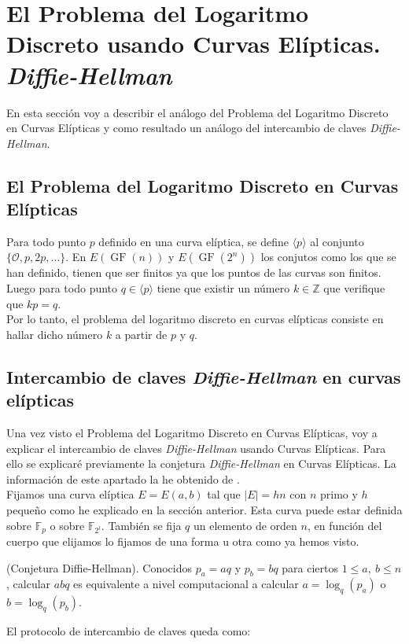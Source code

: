\section{El Problema del Logaritmo Discreto usando Curvas Elípticas. \emph{Diffie-Hellman}}
En esta sección voy a describir el análogo del Problema del Logaritmo Discreto en Curvas Elípticas y como resultado un análogo del intercambio de claves \emph{Diffie-Hellman}.

\subsection{El Problema del Logaritmo Discreto en Curvas Elípticas}
Para todo punto $p$ definido en una curva elíptica, se define $\langle p\rangle$ al conjunto $\{\mathcal{O}, p, 2p, ... \}$.
En $E(\operatorname{GF}(n))$ y $E(\operatorname{GF}(2^n))$ los conjutos como los que se han definido, tienen que ser finitos ya que los puntos de las curvas son finitos. Luego para todo punto $q\in \langle p\rangle$ tiene que existir un número $k \in \mathbb{Z}$ que verifique que $kp=q$.\\
Por lo tanto, el problema del logaritmo discreto en curvas elípticas consiste en hallar dicho número $k$ a partir de $p$ y $q$.
\subsection{Intercambio de claves \emph{Diffie-Hellman} en curvas elípticas}
Una vez visto el Problema del Logaritmo Discreto en Curvas Elípticas, voy a explicar el intercambio de claves \emph{Diffie-Hellman} usando Curvas Elípticas. Para ello se explicaré previamente la conjetura \emph{Diffie-Hellman} en Curvas Elípticas. La información de este apartado la he obtenido de \cite{apuntesCriptografia}.\\
Fijamos una curva elíptica $E=E(a,b)$ tal que $|E|=hn$ con $n$ primo y $h$ pequeño como he explicado en la sección anterior. Esta curva puede estar definida sobre $\mathbb{F}_p$ o sobre $\mathbb{F}_{2^l}$. También se fija  $q$ un elemento de orden $n$, en función del cuerpo que elijamos lo fijamos de una forma u otra como ya hemos visto.
\begin{definicion}
	(Conjetura Diffie-Hellman). Conocidos $p_a=aq$ y $p_b=bq$ para ciertos $1\leq a,\: b\leq n$, calcular $abq$ es equivalente a nivel computacional a calcular $a=\log_q(p_a)$ o $b=\log_q(p_b)$.
\end{definicion}
El protocolo de intercambio de claves queda como:\\


